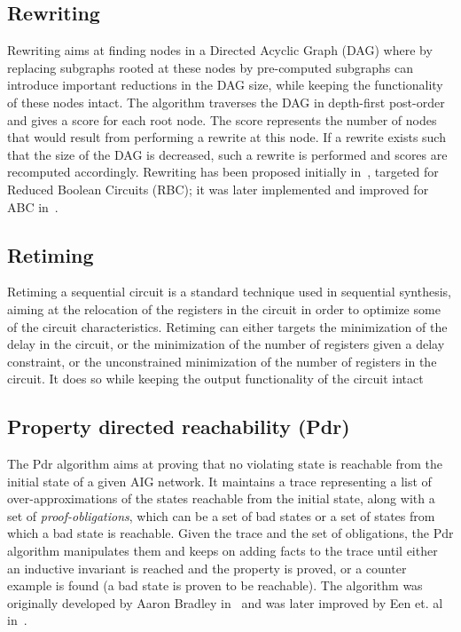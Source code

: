 \subsection{Rewriting}
Rewriting aims at finding nodes in a Directed Acyclic Graph (DAG) where by replacing subgraphs rooted 
at these nodes by pre-computed subgraphs can introduce important reductions in the DAG size, while 
keeping the functionality of these nodes intact. The algorithm traverses the DAG in depth-first post-order
and gives a score for each root node. The score represents the number of nodes that would result
from performing a rewrite at this node. If a rewrite exists such that the size of the DAG is decreased, such 
a rewrite is performed and scores are recomputed accordingly.  
Rewriting has been proposed initially in~\cite{bjesse2004dag}, targeted for Reduced Boolean Circuits (RBC); 
it was later implemented and improved for ABC in~\cite{mishchenko2006dag}. 

\subsection{Retiming}
Retiming a sequential circuit is a standard technique used in sequential synthesis, 
aiming at the relocation of the registers in the circuit in order to optimize 
some of the circuit characteristics. Retiming can either targets the minimization of the delay 
in the circuit, or the minimization of the number of registers given a delay constraint, 
or the unconstrained minimization of the number of registers in the circuit. It 
does so while keeping the output functionality of the circuit intact~\cite{hurst2007fast}

\subsection{Property directed reachability (Pdr)}
The Pdr algorithm aims at proving that no 
violating state is reachable from the initial state of a given AIG network. 
It maintains a trace representing a list of over-approximations of the states
reachable from the initial state, along with a set of {\em proof-obligations}, 
which can be a set of bad states or a set of states from which a bad state is
reachable. Given the trace and the set of obligations, the Pdr algorithm manipulates 
them and keeps on adding facts to the trace until either an inductive invariant 
is reached and the property is proved, or a counter example is found (a bad state
is proven to be reachable). The algorithm was originally developed by Aaron Bradley 
in~\cite{bradley2011sat,bradley2007checking} and was later improved by Een et. al in~\cite{een2011efficient}.

